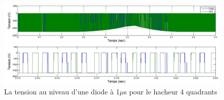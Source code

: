 \documentclass[11pt,letterpaper,final]{report}
\begin{document}
\begin{figure}[htb]
\centering
\includegraphics[scale=0.5]{Fig/DCP_AFE/1u/hash_diode.jpg}
\caption{La tension au niveau d'une diode à 1$\mu$s pour le hacheur 4 quadrants}
\label{AF_DC_HV1}
\end{figure}
\end{document}
